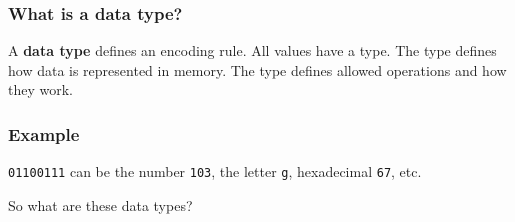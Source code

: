 \documentclass[11pt]{beamer}
\begin{document}

\begin{frame}
  \frametitle{What is a \textbf{data type}?}
  \Enlarge
  \Enlarge

  \begin{itemize}
  \myitem  A \textbf{data type} defines an encoding rule.
  \myitem  All values have a type. \pause
  \myitem  The type defines how data is represented in memory. \pause
  \myitem  The type defines allowed operations and how they work.
  \end{itemize}
\end{frame}

\begin{frame}
  \frametitle{Example}
  \Enlarge

  \texttt{01100111} can be the number \texttt{103}, the letter \texttt{g}, hexadecimal \texttt{67}, etc.
  \begin{itemize}
  \myitem  So what are these data types?
  \end{itemize}
\end{frame}
\end{document}
